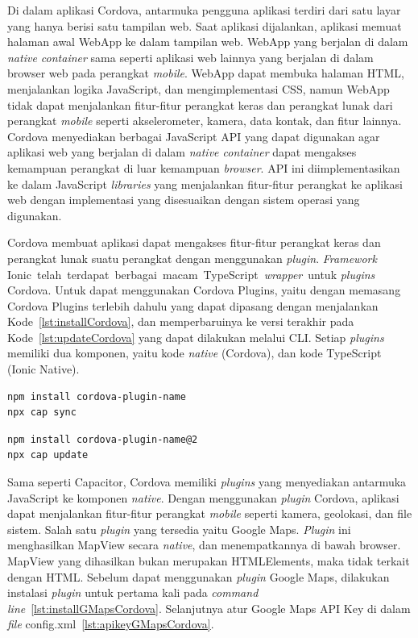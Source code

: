 Di dalam aplikasi Cordova, antarmuka pengguna aplikasi terdiri dari satu layar yang hanya berisi satu tampilan web. Saat aplikasi dijalankan, aplikasi memuat halaman awal WebApp ke dalam tampilan web. WebApp yang berjalan di dalam \textit{native container} sama seperti aplikasi web lainnya yang berjalan di dalam browser web pada perangkat \textit{mobile}. WebApp dapat membuka halaman HTML, menjalankan logika JavaScript, dan mengimplementasi CSS, namun WebApp tidak dapat menjalankan fitur-fitur perangkat keras dan perangkat lunak dari perangkat \textit{mobile} seperti akselerometer, kamera, data kontak, dan fitur lainnya. Cordova menyediakan berbagai JavaScript API yang dapat digunakan agar aplikasi web yang berjalan di dalam \textit{native container} dapat mengakses kemampuan perangkat di luar kemampuan \textit{browser}. API ini diimplementasikan ke dalam JavaScript \textit{libraries} yang menjalankan fitur-fitur perangkat ke aplikasi web dengan implementasi yang disesuaikan dengan sistem operasi yang digunakan.

Cordova membuat aplikasi dapat mengakses fitur-fitur perangkat keras dan perangkat lunak suatu perangkat dengan menggunakan {\it plugin}. {\it Framework} Ionic~telah~terdapat~berbagai~macam~TypeScript~{\it wrapper}~untuk {\it plugins} Cordova.  Untuk dapat menggunakan Cordova Plugins, yaitu dengan memasang Cordova Plugins terlebih dahulu yang dapat dipasang dengan menjalankan Kode~\ref{lst:installCordova}, dan memperbaruinya ke versi terakhir pada Kode~\ref{lst:updateCordova} yang dapat dilakukan melalui CLI. Setiap {\it plugins} memiliki dua komponen, yaitu kode {\it native} (Cordova), dan kode TypeScript (Ionic Native).

\begin{lstlisting}[label={lst:installCordova}, caption=Kode untuk Memasang Cordova Plugins]
npm install cordova-plugin-name
npx cap sync
\end{lstlisting} 

\begin{lstlisting}[label={lst:updateCordova}, caption=Kode untuk Memperbarui Cordova Plugins]
npm install cordova-plugin-name@2
npx cap update
\end{lstlisting} 


Sama seperti Capacitor, Cordova memiliki \textit{plugins} yang menyediakan antarmuka JavaScript ke komponen \textit{native}. Dengan menggunakan \textit{plugin} Cordova, aplikasi dapat menjalankan fitur-fitur perangkat \textit{mobile} seperti kamera,	geolokasi, dan file sistem. Salah satu \textit{plugin} yang tersedia yaitu Google Maps. \textit{Plugin} ini menghasilkan MapView secara \textit{native}, dan menempatkannya di bawah browser. MapView yang dihasilkan bukan merupakan HTMLElements, maka tidak terkait dengan HTML. Sebelum dapat menggunakan \textit{plugin} Google Maps, dilakukan instalasi \textit{plugin} untuk pertama kali pada \textit{command line}~\ref{lst:installGMapsCordova}. Selanjutnya atur Google Maps API Key di dalam \textit{file} config.xml~\ref{lst:apikeyGMapsCordova}. 

